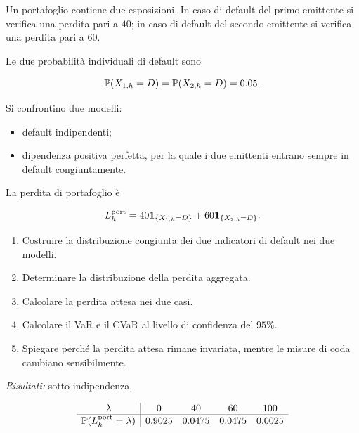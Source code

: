 \begin{exercise}

\label{ex:cap09-portafoglio-dipendenza}

Un portafoglio contiene due esposizioni. In caso di default del primo
emittente si verifica una perdita pari a $40$; in caso di default del
secondo emittente si verifica una perdita pari a $60$.

Le due probabilit\`{a} individuali di default sono

\[
\mathbb{P}(X_{1,h}=D)
=
\mathbb{P}(X_{2,h}=D)
=
0.05.
\]

Si confrontino due modelli:

\begin{itemize}

\item default indipendenti;

\item dipendenza positiva perfetta, per la quale i due emittenti
entrano sempre in default congiuntamente.

\end{itemize}

La perdita di portafoglio \`{e}

\[
L_h^{\mathrm{port}}
=
40\mathbf{1}_{\{X_{1,h}=D\}}
+
60\mathbf{1}_{\{X_{2,h}=D\}}.
\]

\begin{enumerate}

\item Costruire la distribuzione congiunta dei due indicatori di
default nei due modelli.

\item Determinare la distribuzione della perdita aggregata.

\item Calcolare la perdita attesa nei due casi.

\item Calcolare il VaR e il CVaR al livello di confidenza del $95\%$.

\item Spiegare perch\'{e} la perdita attesa rimane invariata, mentre
le misure di coda cambiano sensibilmente.

\end{enumerate}

\textit{Risultati:} sotto indipendenza,

\[
\begin{array}{c|cccc}
\lambda
&
0
&
40
&
60
&
100
\\
\hline
\mathbb{P}(L_h^{\mathrm{port}}=\lambda)
&
0.9025
&
0.0475
&
0.0475
&
0.0025
\end{array}
\]


\end{exercise}

